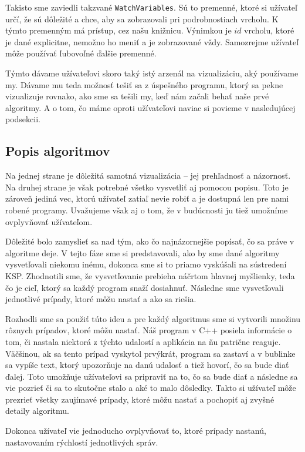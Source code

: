 Takisto sme zaviedli takzvané \verb!WatchVariables!. Sú to premenné, ktoré si užívateľ určí, že sú
dôležité a chce, aby sa zobrazovali pri podrobnostiach vrcholu. K týmto premenným má
prístup, cez našu knižnicu. Výnimkou je $id$ vrcholu, ktoré je dané explicitne, nemožno ho
meniť a je zobrazované vždy. Samozrejme užívateľ môže používať ľubovoľné ďalšie premenné.

Týmto dávame užívateľovi skoro taký istý arzenál na vizualizáciu, aký používame my. Dávame mu teda
možnosť tešiť sa z úspešného programu, ktorý sa pekne vizualizuje rovnako, ako sme sa tešili my, keď
nám začali behať naše prvé algoritmy. A o tom, čo máme oproti užívateľovi naviac si povieme v
nasledujúcej podsekcii.

\subsection{Popis algoritmov}

Na jednej strane je dôležitá samotná vizualizácia -- jej prehľadnosť a názornosť. Na druhej strane
je však potrebné všetko vysvetliť aj pomocou popisu. Toto je zároveň jediná vec, ktorú užívateľ
zatiaľ nevie robiť a je dostupná len pre nami robené programy. Uvažujeme však aj o tom, že v budúcnosti
ju tiež umožníme ovplyvňovať užívateľom.

Dôležité bolo zamyslieť sa nad tým, ako čo najnázornejšie popísať, čo sa práve v algoritme deje.
V tejto fáze sme si predstavovali, ako by sme dané algoritmy vysvetľovali niekomu inému, dokonca sme si to priamo
vyskúšali na sústredení KSP. Zhodnotili sme, že vysvetľovanie prebieha náčrtom hlavnej myšlienky,
teda čo je cieľ, ktorý sa každý program snaží dosiahnuť. Následne sme vysvetľovali jednotlivé prípady, ktoré
môžu nastať a ako sa riešia.

Rozhodli sme sa použiť túto ideu a pre každý algoritmus sme si vytvorili množinu rôznych prípadov,
ktoré môžu nastať. Náš program v C++ posiela informácie o tom, či nastala niektorá z týchto udalostí
a aplikácia na ňu patrične reaguje. Väčšinou, ak sa tento prípad vyskytol prvýkrát, program sa
zastaví a v bublinke sa vypíše text, ktorý upozorňuje na danú udalosť a tiež hovorí, čo sa bude
diať ďalej. Toto umožňuje užívateľovi sa pripraviť na to, čo sa bude diať a následne sa vie pozrieť
či sa to skutočne stalo a aké to malo dôsledky. Takto si užívateľ môže prezrieť všetky zaujímavé
prípady, ktoré môžu nastať a pochopiť aj zvyšné detaily algoritmu.

Dokonca užívateľ vie jednoducho ovplyvňovať to, ktoré prípady nastanú, nastavovaním rýchlostí
jednotlivých správ.

